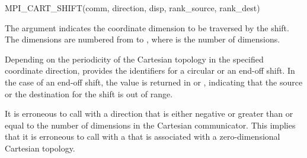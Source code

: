 \begin{funcdef}{MPI\_CART\_SHIFT}{(\mbox{comm}, \mbox{direction}, \mbox{disp}, \mbox{rank\_source}, \mbox{rank\_dest})}
\end{funcdef}

The  argument indicates the coordinate dimension to be traversed by the shift.
The dimensions are numbered from  to , where  is the number of dimensions.

Depending on the periodicity of the Cartesian topology in the specified
coordinate direction,  provides the identifiers for a
circular or an end-off shift. In the case of an end-off shift,
the value  is returned in  or
,
indicating that the source or the destination for the shift is out of range.
 
It is erroneous to call  with a direction that is either
negative or greater than or equal to the number of dimensions in the Cartesian
communicator. This implies that it is erroneous to call  with a
 that is associated with a zero-dimensional Cartesian topology.

